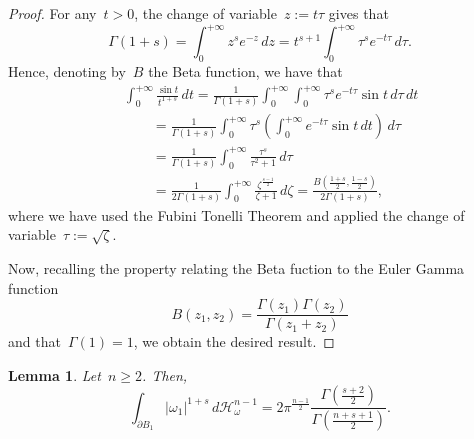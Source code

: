 \documentclass[11pt,hyp,]{nyjm}
\numberwithin{equation}{section}
\newtheorem{lemma}[theorem]{Lemma}
\theoremstyle{remark}
\renewcommand{\geq}{\geqslant}
\begin{document}
\begin{proof}
For any~$t >0$, the change of variable~$z := t \tau$ gives that
\begin{equation*}
\Gamma(1+s) = \int_0^{+\infty} z^{s} e^{-z} \, dz = t^{s+1}\int_0^{+\infty}  \tau^s e^{-t \tau} \, d\tau.
\end{equation*}
Hence, denoting by~$B$ the Beta function, we have that
\begin{eqnarray*} &&
\int_0^{+\infty}  \frac{\sin t}{t^{1+s}}\, dt = \frac{1}{\Gamma(1+s)}\int_0^{+\infty}\int_0^{+\infty} \tau^s e^{-t \tau} \sin t \, d\tau \, dt\\&&\qquad = \frac{1}{\Gamma(1+s)} \int_0^{+\infty} \tau^s \left( \int_0^{+\infty} e^{-t\tau} \sin t \, dt \right)\, d\tau \\&&\qquad= \frac{1}{\Gamma(1+s)} \int_0^{+\infty}\frac{\tau^s}{\tau^2 +1} \, d\tau \\ &&\qquad= \frac{1}{2\Gamma(1+s)}\int_0^{+\infty} \frac{\zeta^{\frac{s-1}{2}}}{\zeta+1} \, d\zeta = \frac{B(\frac{1+s}{2}, \frac{1-s}{2})}{2\Gamma(1+s)},
\end{eqnarray*}
where we have used the Fubini Tonelli Theorem and applied the change of variable~$\tau := \sqrt{\zeta}$.

Now, recalling the property relating the Beta fuction to the Euler Gamma function
\begin{equation}\label{mnbvcxqwertyu1234567890}
B(z_1,z_2)=\frac{\Gamma(z_1)\Gamma(z_2)}{\Gamma(z_1+z_2)} \end{equation}
and that~$\Gamma(1)=1$, we obtain the desired result.
\end{proof}

\begin{lemma}\label{ccc}
Let~$n\geq 2$. Then,
\begin{equation}\label{xx}
\int_{\partial B_1} |\omega_1|^{1+s} \, d\mathcal{H}_{\omega}^{n-1} = 2 \pi^{\frac{n-1}{2}}  \frac{\Gamma\left(\frac{s+2}{2}\right)}{\Gamma\left(\frac{n+s+1}{2}\right)}.
\end{equation}
\end{lemma}
\end{document}
